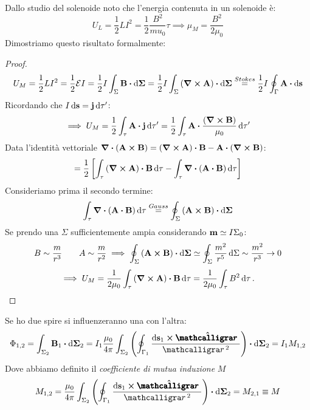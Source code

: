 \documentclass[12pt,a4paper]{article}
\begin{document}
Dallo studio del solenoide noto che l'energia contenuta in un solenoide è:
\begin{equation*}
    U_L = \frac{1}{2}LI^2= \frac{1}{2}\frac{B^2}{mu_0}\tau\implies \mu_M= \frac{B^2}{2\mu_0}
\end{equation*}
Dimostriamo questo risultato formalmente:
\begin{proof}
    \begin{equation*}
        U_M = \frac{1}{2}LI^2= \frac{1}{2}\mathcal{E}I= \frac{1}{2}I\int_\Sigma\vb{B}\vdot\dd{\vb{\Sigma}}= 
    \frac{1}{2}I\int_\Sigma\left( \curl{\vb{A}} \right)\vdot\dd{\vb{\Sigma}}\overset{Stokes}{=}\frac{1}{2}I\oint_\Gamma\vb{A}\vdot\dd{\vb{s}}
    \end{equation*}
    Ricordando che $I\dd{\vb{s}}= \vb{j}\dd{\tau'}$:
    \begin{equation*}
        \implies U_M = \frac{1}{2}\int_\tau\vb{A}\vdot\vb{j}\dd{\tau'} = 
        \frac{1}{2}\int_\tau\vb{A}\vdot\frac{\left( \curl{\vb{B}} \right)}{\mu_0}\dd{\tau'}
    \end{equation*}
    Data l'identità vettoriale $\div(\vb{A}\cp\vb{B})=\left( \curl{\vb{A}} \right)\vdot\vb{B}-\vb{A}\vdot\left( \curl{\vb{B}} \right)$:
    \begin{equation*}
        =\frac{1}{2}\left[ \int_\tau \left( \curl{\vb{A}} \right)\vdot\vb{B}\dd{\tau}-\int_\tau\div(\vb{A}\vdot\vb{B})\dd{\tau} \right]
    \end{equation*}
    Consideriamo prima il secondo termine:
    \begin{equation*}
        \int_\tau\div(\vb{A}\vdot\vb{B})\dd{\tau}\overset{Gauss}{=} \oint_\Sigma\left(\vb{A}\cp\vb{B}\right)\vdot\dd{\vb{\Sigma}}
    \end{equation*}
    Se prendo una $\Sigma$ sufficientemente ampia considerando $\vb{m}\simeq I\Sigma_0$:
    \begin{equation*}
        B \sim\frac{m}{r^3}\qquad A \sim\frac{m}{r^2} \implies\oint_\Sigma\left( \vb{A}\cp\vb{B} \right)\vdot\dd{\vb{\Sigma}}\simeq
        \oint_\Sigma\frac{m^2}{r^5}\dd{\Sigma}\sim \frac{m^2}{r^3}\rightarrow0
    \end{equation*}
    \begin{equation*}
        \implies U_M= \frac{1}{2\mu_0}\int_\tau\left( \curl{\vb{A}} \right)\vdot \vb{B}\dd{\tau}= \frac{1}{2\mu_0}\int_\tau B^2\dd{\tau}.
    \end{equation*}
\end{proof}

Se ho due spire si influenzeranno una con l'altra:
\begin{equation*}
    \Phi_{1,2}=\int_{\Sigma_2}\vb{B}_1\vdot\dd{\vb{\Sigma}_2}= I_1 \frac{\mu_0}{4\pi}\int_{\Sigma_2}
    \left( \oint_{\Gamma_1} \frac{\dd{\vb{s}_1}\cp\vu{\boldscriptr}}{\scriptr^2}\right)\vdot\dd{\vb{\Sigma}_2}= I_1M_{1,2}
\end{equation*}
Dove abbiamo definito il \textit{coefficiente di mutua induzione} $M$
\begin{equation*}
    M_{1,2}= \frac{\mu_0}{4\pi}\int_{\Sigma_2}\left( \oint_{\Gamma_1} \frac{\dd{\vb{s}_1}\cp\vu{\boldscriptr}}{\scriptr^2}\right)
    \vdot\dd{\vb{\Sigma}_2}= M_{2,1}\equiv M 
\end{equation*}
\end{document}
